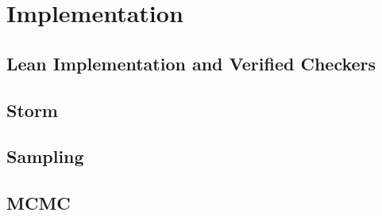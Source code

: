 
\section{Implementation}
\label{sec:implementation}

\subsection{Lean Implementation and Verified Checkers}

\subsection{Storm}

\subsection{Sampling}

\subsection{MCMC}
